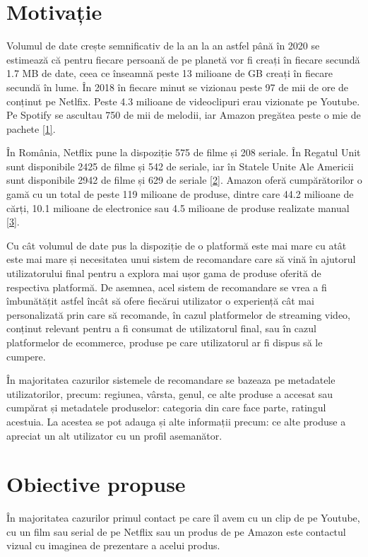 \section{Motivație}

Volumul de date crește semnificativ de la an la an astfel până în 2020 se estimează că pentru fiecare persoană de pe planetă vor fi creați în fiecare secundă 1.7 MB de date, ceea ce înseamnă peste 13 milioane de GB creați în fiecare secundă în lume. În 2018 în fiecare minut se vizionau peste 97 de mii de ore de conținut pe Netlfix. Peste 4.3 milioane de videoclipuri erau vizionate pe Youtube. Pe Spotify se ascultau 750 de mii de melodii, iar Amazon pregătea peste o mie de pachete \hyperlink{domo}{[1]}.

În România, Netflix pune la dispoziție 575 de filme și 208 seriale. În Regatul Unit sunt disponibile 2425 de filme și 542 de seriale, iar în Statele Unite Ale Americii sunt disponibile 2942 de filme și 629 de seriale \hyperlink{finder}{[2]}. Amazon oferă cumpărătorilor o gamă cu un total de peste 119 milioane de produse, dintre care 44.2 milioane de cărți, 10.1 milioane de electronice sau 4.5 milioane de produse realizate manual \hyperlink{scrapehero}{[3]}.

Cu cât volumul de date pus la dispoziție de o platformă este mai mare cu atât este mai mare și necesitatea unui sistem de recomandare care să vină în ajutorul utilizatorului final pentru a explora mai ușor gama de produse oferită de respectiva platformă. De asemnea, acel sistem de recomandare se vrea a fi îmbunătățit astfel încât să ofere fiecărui utilizator o experiență cât mai personalizată prin care să recomande, în cazul platformelor de streaming video, conținut relevant pentru a fi consumat de utilizatorul final, sau în cazul platformelor de ecommerce, produse pe care utilizatorul ar fi dispus să le cumpere.

În majoritatea cazurilor sistemele de recomandare se bazeaza pe metadatele utilizatorilor, precum: regiunea, vârsta, genul, ce alte produse a accesat sau cumpărat și metadatele produselor: categoria din care face parte, ratingul acestuia. La acestea se pot adauga și alte informații precum: ce alte produse a apreciat un alt utilizator cu un profil asemanător.

\section{Obiective propuse}
În majoritatea cazurilor primul contact pe care îl avem cu un clip de pe Youtube, cu un film sau serial de pe Netflix sau un produs de pe Amazon este contactul vizual cu imaginea de prezentare a acelui produs. 

